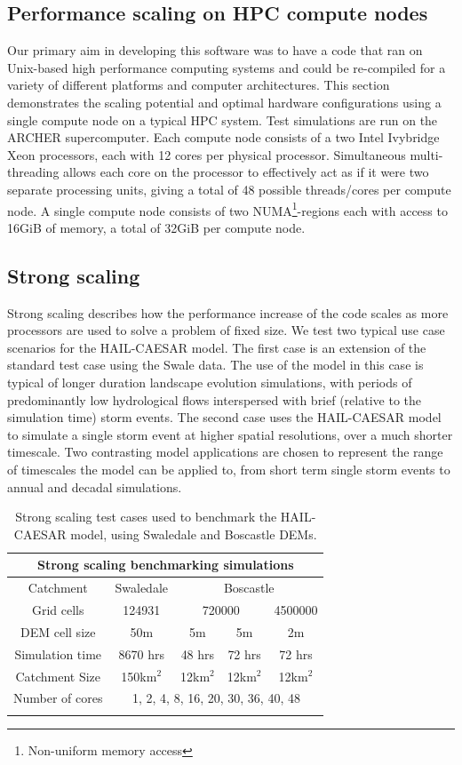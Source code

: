 \subsection{Performance scaling on HPC compute nodes}
Our primary aim in developing this software was to have a code that ran on Unix-based high performance computing systems and could be re-compiled for a variety of different platforms and computer architectures. This section demonstrates the scaling potential and optimal hardware configurations using a single compute node on a typical HPC system. Test simulations are run on the ARCHER supercomputer. Each compute node consists of a two Intel Ivybridge Xeon processors, each with 12 cores per physical processor. Simultaneous multi-threading allows each core on the processor to effectively act as if it were two separate processing units, giving a total of 48 possible threads/cores per compute node. A single compute node consists of two NUMA\footnote{Non-uniform memory access}-regions each with access to 16GiB of memory, a total of 32GiB per compute node. 

\subsection{Strong scaling}
Strong scaling describes how the performance increase of the code scales as more processors are used to solve a problem of fixed size. We test two typical use case scenarios for the HAIL-CAESAR model. The first case is an extension of the standard test case using the Swale data. The use of the model in this case is typical of longer duration landscape evolution simulations, with periods of predominantly low hydrological flows interspersed with brief (relative to the simulation time) storm events. The second case uses the HAIL-CAESAR model to simulate a single storm event at higher spatial resolutions, over a much shorter timescale. Two contrasting model applications are chosen to represent the range of timescales the model can be applied to, from short term single storm events to annual and decadal simulations. 

\begin{table}
\caption{Strong scaling test cases used to benchmark the HAIL-CAESAR model, using Swaledale and Boscastle DEMs.}
\begin{tabular}{ccccc}
\\
\multicolumn{5}{c}{\textbf{Strong scaling benchmarking simulations}} \\
\hline 
Catchment & Swaledale & \multicolumn{3}{c}{Boscastle} \\
Grid cells & 124931 & \multicolumn{2}{c}{720000} & 4500000 \\ 
DEM cell size & 50m & 5m & 5m & 2m \\ 
Simulation time & 8670 hrs & 48 hrs & 72 hrs & 72 hrs \\ 
Catchment Size & 150km$^2$ & {12km$^2$} & {12km$^2$} & {12km$^2$} \\ 
Number of cores & \multicolumn{4}{c}{1, 2, 4, 8, 16, 20, 30, 36, 40, 48} \\ 
\hline \\
\end{tabular} 
\label{strong_scale_table}
\end{table}

